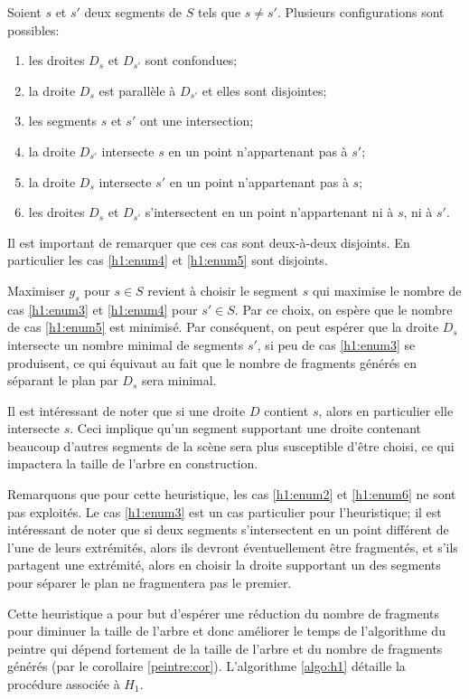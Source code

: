 Soient $s$ et $s'$ deux segments de $S$ tels que $s \ne s'$.
Plusieurs configurations sont possibles:
\begin{enumerate}
\item les droites  $D_s$ et  $D_{s'}$ sont confondues; \label{h1:enum1}
\item la droite $D_s$ est parallèle à $D_{s'} $ et elles sont disjointes; \label{h1:enum2}
\item les segments $s$ et $s'$ ont une intersection; \label{h1:enum3}
\item la droite $D_{s'}$ intersecte $s$ en un point
  n'appartenant pas à $s'$;\label{h1:enum4}
\item la droite $D_{s}$ intersecte $s'$ en un point
  n'appartenant pas à $s$; \label{h1:enum5}
\item les droites $D_s$ et $D_{s'}$ s'intersectent en un point n'appartenant ni
  à $s$, ni à $s'$. \label{h1:enum6}
\end{enumerate}

Il est important de remarquer que ces cas sont deux-à-deux disjoints.
En particulier les cas \ref{h1:enum4} et \ref{h1:enum5} sont disjoints.

Maximiser $g_s$ pour $s \in S$ revient à choisir le segment $s$ qui maximise
le nombre de cas \ref{h1:enum3} et \ref{h1:enum4} pour $s' \in S$.
Par ce choix, on espère que le nombre de cas \ref{h1:enum5} est minimisé.
Par conséquent, on peut espérer que la droite $D_s$ intersecte un
nombre minimal de segments $s'$, si peu de cas \ref{h1:enum3} se produisent,
ce qui équivaut au fait que le
nombre de fragments générés en séparant le plan par $D_s$ sera minimal.

Il est intéressant de noter que si une droite $D$ contient $s$, alors
en particulier elle intersecte $s$. Ceci implique qu'un segment supportant
une droite contenant beaucoup d'autres segments de la scène sera plus
susceptible d'être choisi, ce qui impactera la taille de l'arbre en construction.

Remarquons que pour cette heuristique, les cas \ref{h1:enum2} et
\ref{h1:enum6} ne sont pas exploités.
Le cas \ref{h1:enum3} est un cas particulier pour l'heuristique;
il est intéressant de noter que si deux segments s'intersectent
en un point différent de l'une de leurs extrémités, alors ils devront
éventuellement être fragmentés, et s'ils partagent une extrémité, alors
en choisir la droite supportant un des segments pour séparer le plan ne
fragmentera pas le premier.

Cette heuristique a pour but d'espérer une réduction du nombre de fragments
pour diminuer la taille de l'arbre
et donc améliorer le temps de l'algorithme du peintre qui dépend
fortement de la taille de l'arbre et du nombre de fragments générés (par
le corollaire \ref{peintre:cor}). L'algorithme \ref{algo:h1} détaille
la procédure associée à $H_1$.

